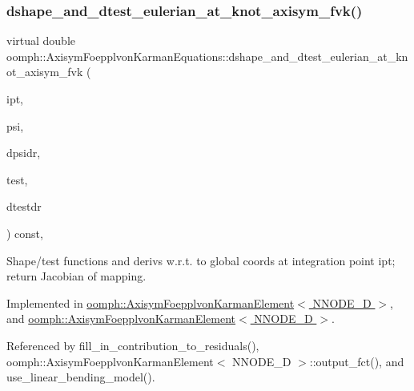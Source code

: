 \subsubsection{\texorpdfstring{dshape\+\_\+and\+\_\+dtest\+\_\+eulerian\+\_\+at\+\_\+knot\+\_\+axisym\+\_\+fvk()}{dshape\_and\_dtest\_eulerian\_at\_knot\_axisym\_fvk()}\hspace{0.1cm}{\footnotesize\ttfamily [2/2]}}
{\footnotesize\ttfamily virtual double oomph\+::\+Axisym\+Foepplvon\+Karman\+Equations\+::dshape\+\_\+and\+\_\+dtest\+\_\+eulerian\+\_\+at\+\_\+knot\+\_\+axisym\+\_\+fvk (\begin{DoxyParamCaption}\item[{const unsigned \&}]{ipt,  }\item[{\hyperlink{classoomph_1_1Shape}{Shape} \&}]{psi,  }\item[{\hyperlink{classoomph_1_1DShape}{D\+Shape} \&}]{dpsidr,  }\item[{\hyperlink{classoomph_1_1Shape}{Shape} \&}]{test,  }\item[{\hyperlink{classoomph_1_1DShape}{D\+Shape} \&}]{dtestdr }\end{DoxyParamCaption}) const\hspace{0.3cm}{\ttfamily [protected]}, {}}



Shape/test functions and derivs w.\+r.\+t. to global coords at integration point ipt; return Jacobian of mapping. 



Implemented in \hyperlink{classoomph_1_1AxisymFoepplvonKarmanElement_a20841d263ec4590d5614d43f2f813ae7}{oomph\+::\+Axisym\+Foepplvon\+Karman\+Element$<$ N\+N\+O\+D\+E\+\_\+D $>$}, and \hyperlink{classoomph_1_1AxisymFoepplvonKarmanElement_a20841d263ec4590d5614d43f2f813ae7}{oomph\+::\+Axisym\+Foepplvon\+Karman\+Element$<$ N\+N\+O\+D\+E\+\_\+D $>$}.



Referenced by fill\+\_\+in\+\_\+contribution\+\_\+to\+\_\+residuals(), oomph\+::\+Axisym\+Foepplvon\+Karman\+Element$<$ N\+N\+O\+D\+E\+\_\+D $>$\+::output\+\_\+fct(), and use\+\_\+linear\+\_\+bending\+\_\+model().

\mbox{\label{classoomph_1_1AxisymFoepplvonKarmanEquations_a838cd424e2666b007113de0a95f5d999}} 
